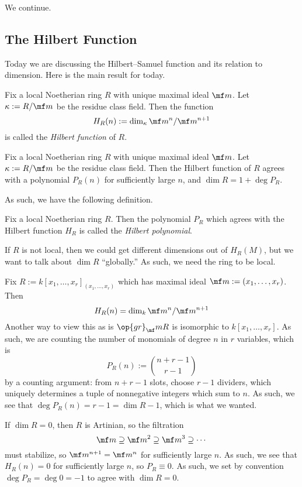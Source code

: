 
We continue.

\subsection{The Hilbert Function}
Today we are discussing the Hilbert--Samuel function and its relation to dimension. Here is the main result for today.
\begin{definition}
	Fix a local Noetherian ring $R$ with unique maximal ideal $\mf m$. Let $\kappa:=R/\mf m$ be the residue class field. Then the function
	\[H_R(n):=\dim_\kappa\mf m^n/\mf m^{n+1}\]
	is called the \textit{Hilbert function} of $R$.
\end{definition}
\begin{theorem} \label{thm:hilpoly}
	Fix a local Noetherian ring $R$ with unique maximal ideal $\mf m$. Let $\kappa:=R/\mf m$ be the residue class field. Then the Hilbert function of $R$ agrees with a polynomial $P_R(n)$ for sufficiently large $n$, and $\dim R=1+\deg P_R$.
\end{theorem}
As such, we have the following definition.
\begin{definition}
	Fix a local Noetherian ring $R$. Then the polynomial $P_R$ which agrees with the Hilbert function $H_R$ is called the \textit{Hilbert polynomial}.
\end{definition}
\begin{remark}
	If $R$ is not local, then we could get different dimensions out of $H_R(M)$, but we want to talk about $\dim R$ ``globally.'' As such, we need the ring to be local.
\end{remark}
\begin{example}
	Fix $R:=k[x_1,\ldots,x_r]_{(x_1,\ldots,x_r)}$ which has maximal ideal $\mf m:=(x_1,\ldots,x_r)$. Then
	\[H_R(n)=\dim_k\mf m^n/\mf m^{n+1}\]
	Another way to view this as is $\op{gr}_\mf mR$ is isomorphic to $k[x_1,\ldots,x_r]$. As such, we are counting the number of monomials of degree $n$ in $r$ variables, which is
	\[P_R(n):=\binom{n+r-1}{r-1}\]
	by a counting argument: from $n+r-1$ slots, choose $r-1$ dividers, which uniquely determines a tuple of nonnegative integers which sum to $n$. As such, we see that $\deg P_R(n)=r-1=\dim R-1$, which is what we wanted.
\end{example}
\begin{example} \label{ex:dimzerohilpoly}
	If $\dim R=0$, then $R$ is Artinian, so the filtration
	\[\mf m\supseteq\mf m^2\supseteq\mf m^3\supseteq\cdots\]
	must stabilize, so $\mf m^{n+1}=\mf m^n$ for sufficiently large $n$. As such, we see that $H_R(n)=0$ for sufficiently large $n$, so $P_R\equiv0$. As such, we set by convention $\deg P_R=\deg0=-1$ to agree with $\dim R=0$.
\end{example}

